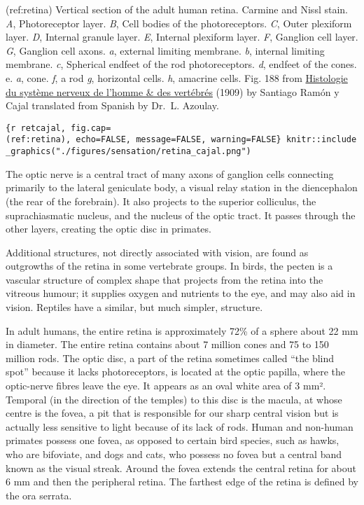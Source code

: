 (ref:retina) Vertical section of the adult human retina. Carmine and
Nissl stain. \emph{A}, Photoreceptor layer. \emph{B}, Cell bodies of the
photoreceptors. \emph{C}, Outer plexiform layer. \emph{D}, Internal
granule layer. \emph{E}, Internal plexiform layer. \emph{F}, Ganglion
cell layer. \emph{G}, Ganglion cell axons. \emph{a}, external limiting
membrane. \emph{b}, internal limiting membrane. \emph{c}, Spherical
endfeet of the rod photoreceptors. \emph{d}, endfeet of the cones. e.
\emph{a}, cone. \emph{f}, a rod \emph{g}, horizontal cells. \emph{h},
amacrine cells. Fig. 188 from
\href{https://wellcomelibrary.org/item/b2129592x\#?c=0\&m=0\&s=0\&cv=0\&z=-0.9137\%2C-0.0887\%2C2.8274\%2C1.7747}{Histologie
du système nerveux de l'homme \& des vertébrés} (1909) by Santiago Ramón
y Cajal translated from Spanish by Dr.~L. Azoulay.

\texttt{\{r\ retcajal,\ fig.cap=\textquotesingle{}(ref:retina)\textquotesingle{},\ echo=FALSE,\ message=FALSE,\ warning=FALSE\}\ knitr::include\_graphics("./figures/sensation/retina\_cajal.png")}

The optic nerve is a central tract of many axons of ganglion cells
connecting primarily to the lateral geniculate body, a visual relay
station in the diencephalon (the rear of the forebrain). It also
projects to the superior colliculus, the suprachiasmatic nucleus, and
the nucleus of the optic tract. It passes through the other layers,
creating the optic disc in primates.

Additional structures, not directly associated with vision, are found as
outgrowths of the retina in some vertebrate groups. In birds, the pecten
is a vascular structure of complex shape that projects from the retina
into the vitreous humour; it supplies oxygen and nutrients to the eye,
and may also aid in vision. Reptiles have a similar, but much simpler,
structure.

In adult humans, the entire retina is approximately 72\% of a sphere
about 22 mm in diameter. The entire retina contains about 7 million
cones and 75 to 150 million rods. The optic disc, a part of the retina
sometimes called ``the blind spot'' because it lacks photoreceptors, is
located at the optic papilla, where the optic-nerve fibres leave the
eye. It appears as an oval white area of 3 mm². Temporal (in the
direction of the temples) to this disc is the macula, at whose centre is
the fovea, a pit that is responsible for our sharp central vision but is
actually less sensitive to light because of its lack of rods. Human and
non-human primates possess one fovea, as opposed to certain bird
species, such as hawks, who are bifoviate, and dogs and cats, who
possess no fovea but a central band known as the visual streak. Around
the fovea extends the central retina for about 6 mm and then the
peripheral retina. The farthest edge of the retina is defined by the ora
serrata.

